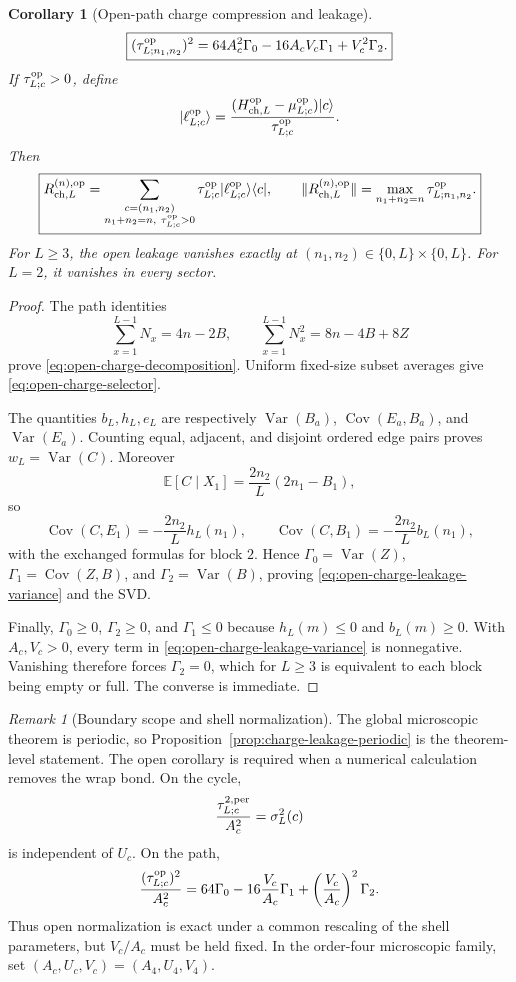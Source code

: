 \documentclass[11pt]{article}
\newtheorem{corollary}[theorem]{Corollary}
\theoremstyle{definition}
\theoremstyle{remark}
\newtheorem{remark}[theorem]{Remark}
\newcommand{\ket}[1]{\lvert #1\rangle}
\newcommand{\bra}[1]{\langle #1\rvert}
\newcommand{\norm}[1]{\lVert #1\rVert}
\begin{document}
\begin{corollary}[Open-path charge compression and leakage]
\begin{equation}
 \boxed{
 (\tau_{L;n_1,n_2}^{\rm op})^2
 =64A_c^2\Gamma_0-16A_cV_c\Gamma_1+V_c^2\Gamma_2.}
 \label{eq:open-charge-leakage-variance}
\end{equation}
If $\tau_{L;c}^{\rm op}>0$, define
\[
 \ket{\ell_{L;c}^{\rm op}}
 =\frac{(H_{{\rm ch},L}^{\rm op}-\mu_{L;c}^{\rm op})\ket c}
 {\tau_{L;c}^{\rm op}}.
\]
Then
\begin{equation}
 \boxed{
 R_{{\rm ch},L}^{(n),\rm op}
 =\sum_{\substack{c=(n_1,n_2)\\n_1+n_2=n,\ \tau_{L;c}^{\rm op}>0}}
 \tau_{L;c}^{\rm op}\ket{\ell_{L;c}^{\rm op}}\bra c,
 \qquad
 \norm{R_{{\rm ch},L}^{(n),\rm op}}
 =\max_{n_1+n_2=n}\tau_{L;n_1,n_2}^{\rm op}.}
 \label{eq:open-charge-leakage-svd}
\end{equation}
For $L\ge3$, the open leakage vanishes exactly at
$(n_1,n_2)\in\{0,L\}\times\{0,L\}$.  For $L=2$, it vanishes in every sector.
\end{corollary}

\begin{proof}
The path identities
\[
 \sum_{x=1}^{L-1}N_x=4n-2B,
 \qquad
 \sum_{x=1}^{L-1}N_x^2=8n-4B+8Z
\]
prove \eqref{eq:open-charge-decomposition}.  Uniform fixed-size subset averages
give \eqref{eq:open-charge-selector}.

The quantities $b_L,h_L,e_L$ are respectively
$\operatorname{Var}(B_a)$, $\operatorname{Cov}(E_a,B_a)$, and
$\operatorname{Var}(E_a)$.  Counting equal, adjacent, and disjoint ordered edge
pairs proves $w_L=\operatorname{Var}(C)$.  Moreover
\[
 \mathbb E[C\mid X_1]=\frac{2n_2}{L}(2n_1-B_1),
\]
so
\[
 \operatorname{Cov}(C,E_1)=-\frac{2n_2}{L}h_L(n_1),
 \qquad
 \operatorname{Cov}(C,B_1)=-\frac{2n_2}{L}b_L(n_1),
\]
with the exchanged formulas for block $2$.  Hence
$\Gamma_0=\operatorname{Var}(Z)$,
$\Gamma_1=\operatorname{Cov}(Z,B)$, and
$\Gamma_2=\operatorname{Var}(B)$, proving
\eqref{eq:open-charge-leakage-variance} and the SVD.

Finally, $\Gamma_0\ge0$, $\Gamma_2\ge0$, and $\Gamma_1\le0$ because
$h_L(m)\le0$ and $b_L(m)\ge0$.  With $A_c,V_c>0$, every term in
\eqref{eq:open-charge-leakage-variance} is nonnegative.  Vanishing therefore
forces $\Gamma_2=0$, which for $L\ge3$ is equivalent to each block being empty
or full.  The converse is immediate.
\end{proof}

\begin{remark}[Boundary scope and shell normalization]
The global microscopic theorem is periodic, so
Proposition~\ref{prop:charge-leakage-periodic} is the theorem-level statement.
The open corollary is required when a numerical calculation removes the wrap
bond.  On the cycle,
\[
 \frac{\tau_{L;c}^{2,{\rm per}}}{A_c^2}=\sigma_L^2(c)
\]
is independent of $U_c$.  On the path,
\[
 \frac{(\tau_{L;c}^{\rm op})^2}{A_c^2}
 =64\Gamma_0-16\frac{V_c}{A_c}\Gamma_1
 +\left(\frac{V_c}{A_c}\right)^2\Gamma_2.
\]
Thus open normalization is exact under a common rescaling of the shell
parameters, but $V_c/A_c$ must be held fixed.  In the order-four microscopic
family, set $(A_c,U_c,V_c)=(A_4,U_4,V_4)$.
\end{remark}
\end{document}
